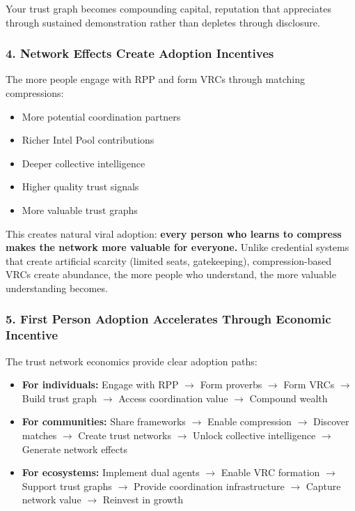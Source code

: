 \documentclass[11pt,a4paper]{article}
\theoremstyle{definition}
\begin{document}
Your trust graph becomes compounding capital, reputation that appreciates through sustained demonstration rather than depletes through disclosure.

\subsubsection{4. Network Effects Create Adoption Incentives}

The more people engage with RPP and form VRCs through matching compressions:

\begin{itemize}
    \item More potential coordination partners
    \item Richer Intel Pool contributions
    \item Deeper collective intelligence
    \item Higher quality trust signals
    \item More valuable trust graphs
\end{itemize}

This creates natural viral adoption: \textbf{every person who learns to compress makes the network more valuable for everyone.} Unlike credential systems that create artificial scarcity (limited seats, gatekeeping), compression-based VRCs create abundance, the more people who understand, the more valuable understanding becomes.

\subsubsection{5. First Person Adoption Accelerates Through Economic Incentive}

The trust network economics provide clear adoption paths:

\begin{itemize}
    \item \textbf{For individuals:} Engage with RPP $\rightarrow$ Form proverbs $\rightarrow$ Form VRCs $\rightarrow$ Build trust graph $\rightarrow$ Access coordination value $\rightarrow$ Compound wealth
    \item \textbf{For communities:} Share frameworks $\rightarrow$ Enable compression $\rightarrow$ Discover matches $\rightarrow$ Create trust networks $\rightarrow$ Unlock collective intelligence $\rightarrow$ Generate network effects
    \item \textbf{For ecosystems:} Implement dual agents $\rightarrow$ Enable VRC formation $\rightarrow$ Support trust graphs $\rightarrow$ Provide coordination infrastructure $\rightarrow$ Capture network value $\rightarrow$ Reinvest in growth
\end{itemize}
\end{document}
